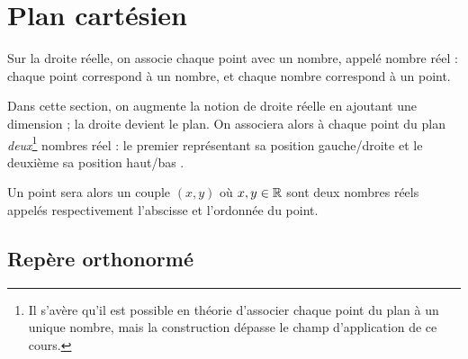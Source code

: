 
\chapter{Plan cartésien}
\label{sec:geom-plane}\label{chap:plan-cartésien}

Sur la droite réelle, on associe chaque point avec un nombre, appelé nombre réel : chaque point correspond à un nombre, et chaque nombre correspond à un point.

Dans cette section, on augmente la notion de droite réelle en ajoutant une dimension ; la droite devient le plan.
On associera alors à chaque point du plan \emph{deux}\footnote{Il s'avère qu'il est possible en théorie d'associer chaque point du plan à un unique nombre, mais la construction dépasse le champ d'application de ce cours.} nombres réel : le premier représentant sa position \og gauche/droite \fg et le deuxième sa position \og haut/bas \fg.

Un point sera alors un couple $(x,y)$ où $x,y \in \mathbb{R}$ sont deux nombres réels appelés respectivement l'abscisse et l'ordonnée du point.

\section{Repère orthonormé}


